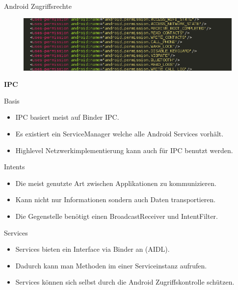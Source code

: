 \documentclass{beamer}
\begin{document}
\begin{frame}{Android Zugriffsrechte}
\begin{figure}[hb]
 \centering
 \includegraphics[scale=0.5]{perms-more}
\end{figure}
\end{frame}

\begin{frame}
\begin{center}
\huge\textbf{IPC}
\end{center}
\end{frame}

\begin{frame}{Basis}
\begin{itemize}
\item IPC basiert meist auf Binder IPC.
\item Es existiert ein ServiceManager welche alle Android Services vorhält.
\item Highlevel Netzwerkimplementierung kann auch für IPC benutzt werden.
\end{itemize}
\end{frame}

\begin{frame}{Intents}
\begin{itemize}
\item Die meist genutzte Art zwischen Applikationen zu kommunizieren.
\item Kann nicht nur Informationen sondern auch Daten transportieren.
\item Die Gegenstelle benötigt einen BroadcastReceiver und IntentFilter.
\end{itemize}
\end{frame}

\begin{frame}{Services}
\begin{itemize}
\item Services bieten ein Interface via Binder an (AIDL).
\item Dadurch kann man Methoden im einer Serviceinstanz aufrufen.
\item Services können sich selbst durch die Android Zugriffskontrolle schützen.
\end{itemize}
\end{frame}
\end{document}
